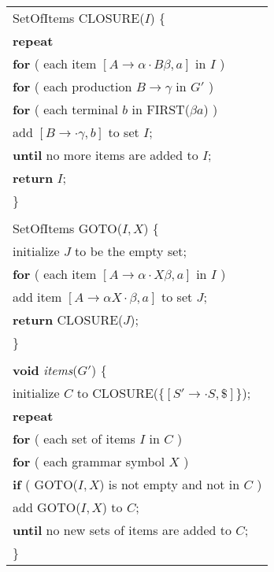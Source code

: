 \documentclass[12pt,a4paper,twoside,openany]{book}
\begin{document}

\begin{center}
    \begin{tabular}{l}
        SetOfItems CLOSURE($I$) \{\\
        \qquad\textbf{repeat}\\
        \qquad\qquad\textbf{for} ( each item $[A\rightarrow\alpha\cdot B\beta,a]$ in $I$ )\\
        \qquad\qquad\qquad\textbf{for} ( each production $B\rightarrow\gamma$ in $G'$ )\\
        \qquad\qquad\qquad\qquad\textbf{for} ( each terminal $b$ in FIRST($\beta a$) )\\
        \qquad\qquad\qquad\qquad\qquad add $[B\rightarrow\cdot\gamma,b]$ to set $I$;\\
        \qquad\textbf{until} no more items are added to $I$;\\
        \qquad\textbf{return} $I$;\\
        \}\\
        \\
        SetOfItems GOTO($I,X$) \{\\
        \qquad initialize $J$ to be the empty set;\\
        \qquad\textbf{for} ( each item $[A\rightarrow\alpha\cdot X\beta,a]$ in $I$ )\\
        \qquad\qquad add item $[A\rightarrow\alpha X\cdot\beta,a]$ to set $J$;\\
        \qquad\textbf{return} CLOSURE($J$);\\
        \}\\
        \\
        \textbf{void} \textit{items}($G'$) \{\\
        \qquad initialize $C$ to CLOSURE($\{[S'\rightarrow\cdot S,\mathdollar]\}$);\\
        \qquad\textbf{repeat}\\
        \qquad\qquad\textbf{for} ( each set of items $I$ in $C$ )\\
        \qquad\qquad\qquad\textbf{for} ( each grammar symbol $X$ )\\
        \qquad\qquad\qquad\qquad\textbf{if} ( GOTO($I,X$) is not empty and not in $C$ )\\
        \qquad\qquad\qquad\qquad\qquad add GOTO($I,X$) to $C$;\\
        \qquad\textbf{until} no new sets of items are added to $C$;\\
        \}
    \end{tabular}
\end{center}
\end{document}
